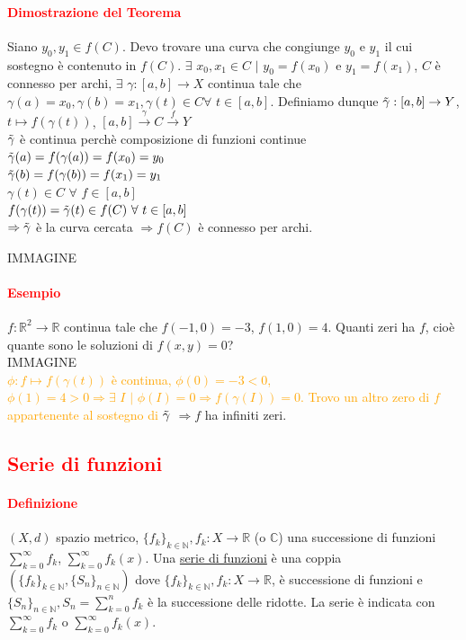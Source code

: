 \documentclass{article}
\newcommand{\R}{\mathbb{R}}
\newcommand{\C}{\mathbb{C}}
\newcommand{\N}{\mathbb{N}}
\begin{document}
\paragraph{\textcolor{red}{Dimostrazione del Teorema}}
Siano $y_0,y_1 \in f(C)$. Devo trovare una curva che congiunge $y_0$ e $y_1$ il cui sostegno è contenuto in $f(C)$. $\exists \,\, x_0,x_1 \in C\,\, |\,\, y_0= f(x_0)$ e $y_1=f(x_1)$, $C$ è connesso per archi, $\exists\,\, \gamma:[a,b]\rightarrow X$ continua tale che $\gamma(a)=x_0, \gamma(b)=x_1, \gamma(t)\in C \forall\,\, t \in [a,b]$. Definiamo dunque $\Tilde{\gamma}:[a,b] \rightarrow Y$, $t \mapsto f(\gamma(t))$, $[a,b]\xrightarrow{\gamma} C \xrightarrow{f}Y$ \\
$\Tilde{\gamma}$ è continua perchè composizione di funzioni continue\\
$\Tilde{\gamma}(a)=f(\gamma(a))=f(x_0)=y_0$\\
$\Tilde{\gamma}(b)=f(\gamma(b))=f(x_1)=y_1$\\
$\gamma(t)\in C\,\, \forall\,\, f \in [a,b]$\\
$f(\gamma(t))=\Tilde{\gamma}(t)\in f(C)\,\,\forall\,\,t \in [a,b]$\\
$\Rightarrow \Tilde{\gamma}$ è la curva cercata $\Rightarrow f(C)$ è connesso per archi.
\begin{flushright}
\large\Lightning
\end{flushright}
IMMAGINE

\paragraph{\textcolor{red}{Esempio}}
$f:\R^2\rightarrow \R$ continua tale che $f(-1,0)=-3$, $f(1,0)=4$. Quanti zeri ha $f$, cioè quante sono le soluzioni di $f(x,y)=0$?\\
IMMAGINE\\
\textcolor{orange}{$\phi : f \mapsto f(\gamma(t))$ è continua, $\phi(0)=-3 <0$, $\phi(1)=4 >0 \Rightarrow \exists\,\, I\,\, |\,\, \phi(I)=0 \Rightarrow f(\gamma(I))=0$. Trovo un altro zero di $f$ appartenente al sostegno di $\Tilde{\gamma}$} $\Rightarrow f$ ha infiniti zeri.

\subsection{\textcolor{red}{Serie di funzioni}}
\paragraph{\textcolor{red}{Definizione}}
$(X,d)$ spazio metrico, $\{f_k\}_{k \in \N}, f_k : X \rightarrow \R $ (o $\C$) una successione di funzioni $\sum_{k=0}^{\infty} f_k$, $\sum_{k=0}^{\infty}f_k(x)$. Una \underline{serie di funzioni} è una coppia $(\{f_k\}_{k \in \N},\{S_n\}_{n \in \N})$ dove $\{f_k\}_{k \in \N}, f_k: X \rightarrow \R$, è successione di funzioni e $\{S_n\}_{n \in \N}, S_n = \sum_{k=0}^{n}f_k$ è la successione delle ridotte. La serie è indicata con $\sum_{k=0}^{\infty}f_k$ o $\sum_{k=0}^{\infty}f_k (x)$.
\end{document}
